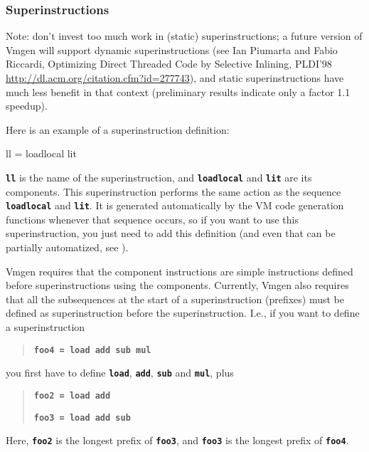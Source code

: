 \documentclass[10pt,english]{article}
\begin{document}
\subsubsection{Superinstructions\label{sub:Superinstructions}}

Note: don't invest too much work in (static) superinstructions; a
future version of Vmgen will support dynamic superinstructions (see
Ian Piumarta and Fabio Riccardi, Optimizing Direct Threaded Code by
Selective Inlining, PLDI'98 \url{http://dl.acm.org/citation.cfm?id=277743}),
and static superinstructions have much less benefit in that context
(preliminary results indicate only a factor 1.1 speedup).

Here is an example of a superinstruction definition:

\nwenddocs{}\endmoddef
ll = loadlocal lit
\nwendcode{}\nwdocspar

\texttt{\textbf{ll}} is the name of the superinstruction, and \texttt{\textbf{loadlocal}}
and \texttt{\textbf{lit}} are its components. This superinstruction
performs the same action as the sequence \texttt{\textbf{loadlocal}}
and \texttt{\textbf{lit}}. It is generated automatically by the VM
code generation functions whenever that sequence occurs, so if you
want to use this superinstruction, you just need to add this definition
(and even that can be partially automatized, see ).

Vmgen requires that the component instructions are simple instructions
defined before superinstructions using the components. Currently,
Vmgen also requires that all the subsequences at the start of a superinstruction
(prefixes) must be defined as superinstruction before the superinstruction.
I.e., if you want to define a superinstruction
\begin{quotation}
\texttt{\textbf{foo4 = load add sub mul}}
\end{quotation}
you first have to define \texttt{\textbf{load}}, \texttt{\textbf{add}},
\texttt{\textbf{sub}} and \texttt{\textbf{mul}}, plus
\begin{quotation}
\texttt{\textbf{foo2 = load add}}

\texttt{\textbf{foo3 = load add sub}}
\end{quotation}
Here, \texttt{\textbf{foo2}} is the longest prefix of \texttt{\textbf{foo3}},
and \texttt{\textbf{foo3}} is the longest prefix of \texttt{\textbf{foo4}}.
\end{document}
